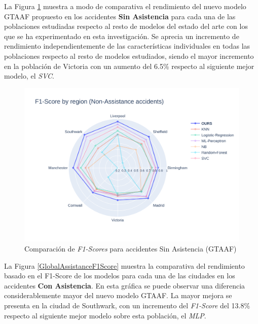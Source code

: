 La Figura \ref{GlobalSlightF1Score} muestra a modo de comparativa el rendimiento del nuevo modelo GTAAF propuesto en los accidentes \textbf{Sin Asistencia} para cada una de las poblaciones estudiadas respecto al resto de modelos del estado del arte con los que se ha experimentado en esta investigación. Se aprecia un incremento de rendimiento independientemente de las características individuales en todas las poblaciones respecto al resto de modelos estudiados, siendo el mayor incremento en la población de Victoria con un aumento del 6.5\% respecto al siguiente mejor modelo, el \textit{SVC}.

\begin{figure}[H]
	\centering
	\includegraphics[width=150mm]{Figures/Slight.png}
	\caption{Comparación de \textit{F1-Scores} para accidentes Sin Asistencia (GTAAF)}
	\label{GlobalSlightF1Score}
\end{figure}

La Figura \ref{GlobalAssistanceF1Score} muestra la comparativa del rendimiento basado en el F1-Score de los modelos para cada una de las ciudades en los accidentes \textbf{Con Asistencia}. En esta gráfica se puede observar una diferencia considerablemente mayor del nuevo modelo GTAAF. La mayor mejora se presenta en la ciudad de Southwark, con un incremento del \textit{F1-Score} del 13.8\% respecto al siguiente mejor modelo sobre esta población, el \textit{MLP}.

